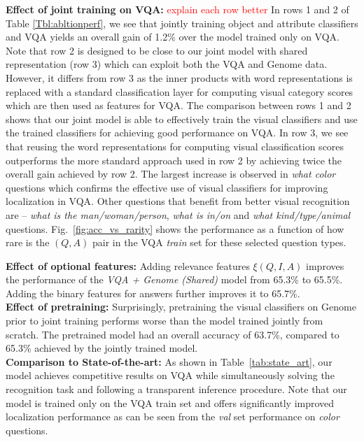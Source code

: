 \documentclass[10pt,twocolumn,letterpaper]{article}
\newcommand\todo[1]{\textcolor{red}{#1}}
\begin{document}
\noindent
\textbf{Effect of joint training on VQA:} \todo{explain each row better} In rows 1 and 2 of Table \ref{Tbl:abltionperf}, we see that jointly training object and attribute classifiers and VQA yields an overall gain of 1.2\% over the model trained only on VQA. Note that row 2 is designed to be close to our joint model with shared representation (row 3) which can exploit both the VQA and Genome data. However, it differs from row 3 as the inner products with word representations is replaced with a standard classification layer for computing visual category scores which are then used as features for VQA. The comparison between rows 1 and 2 shows that our joint model is able to effectively train the visual classifiers and use the trained classifiers for achieving good performance on VQA. In row 3, we see that reusing the word representations for computing visual classification scores outperforms the more standard approach used in row 2 by achieving twice the overall gain achieved by row 2. The largest increase is observed in \textit{what color} questions which confirms the effective use of visual classifiers for improving localization in VQA. Other questions that benefit from better visual recognition are -- \textit{what is the man/woman/person}, \textit{what is in/on} and \textit{what kind/type/animal} questions. Fig.~\ref{fig:acc_vs_rarity} shows the performance as a function of how rare is the $(Q,A)$ pair in the VQA \textit{train} set for these selected question types. 

\noindent
\textbf{Effect of optional features:} Adding relevance features $\xi(Q,I,A)$ improves the performance of the \textit{VQA + Genome (Shared)} model from 65.3\% to 65.5\%. Adding the binary features for answers further improves it to 65.7\%. \\

\noindent
\textbf{Effect of pretraining:} Surprisingly, pretraining the visual classifiers on Genome prior to joint training performs worse than the model trained jointly from scratch. The pretrained model had an overall accuracy of 63.7\%, compared to 65.3\% achieved by the jointly trained model. \\

\noindent
\textbf{Comparison to State-of-the-art:} As shown in Table~\ref{tab:state_art}, our model achieves competitive results on VQA while simultaneously solving the recognition task and following a transparent inference procedure. Note that our model is trained only on the VQA train set and offers significantly improved localization performance as can be seen from the \textit{val} set performance on \textit{color} questions. \\
\end{document}
